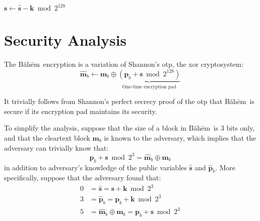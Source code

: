 \documentclass[twocolumn,hidelinks]{article}
\newcommand{\baheem}{Băhēm}
\begin{document}
\begin{algorithm}
    \hrulefill\\
    $\mathbf{s} \gets \mathbf{\hat s} - \mathbf{k} \bmod{2^{128}}$\\
    \caption{\baheem\ decryption}
    \label{alg_dec}
\end{algorithm}

\section{Security Analysis}
The \baheem\ encryption is a variation of Shannon's \gls{otp}, the
\gls{xor} cryptosystem:
\[
    \mathbf{\hat m}_b \gets \mathbf{m}_b \oplus
    \underbrace{
        (\mathbf{p}_b + \mathbf{s} \bmod{2^{128}})
    }_{\text{One-time encryption pad}}
\]

It trivially follows from Shannon's perfect secrecy proof of the \gls{otp}
\cite{perfect_secrecy} that \baheem\ is secure if its encryption pad
maintains its security.

To simplify the analysis, suppose that the size of a block in \baheem\ is
$3$ bits only, and that the cleartext block $\mathbf{m}_b$ is known to the
adversary, which implies that the adversary can trivially know that:
\[
    \mathbf{p}_b + \mathbf{s} \bmod{2^3}
    = \mathbf{\hat m}_b \oplus \mathbf{m}_b
\]
in addition to adversary's knowledge of the public variables $\mathbf{\hat
s}$ and $\mathbf{\hat p}_b$. More specifically, suppose that the
adversary found that:
\begin{align*}
    0&=\mathbf{\hat s} = \mathbf{s} + \mathbf{k} \bmod{2^3}  \\
    3&=\mathbf{\hat p}_b = \mathbf{p}_b + \mathbf{k} \bmod{2^3}  \\
    5&=\mathbf{\hat m}_b \oplus \mathbf{m}_b
            = \mathbf{p}_b + \mathbf{s} \bmod{2^3}\\
\end{align*}
\end{document}
